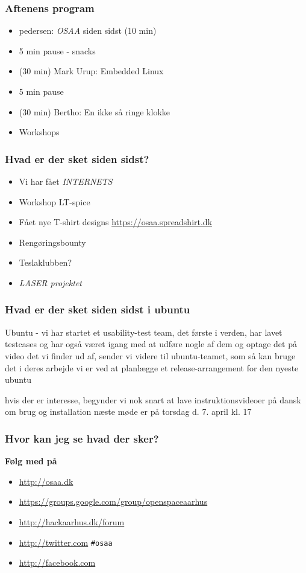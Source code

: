 \documentclass{beamer}
\begin{document}
\begin{frame}
  \frametitle{Aftenens program}
  \begin{itemize}
  \item pedersen: \emph{OSAA} siden sidst (10 min)
  \item 5 min pause - snacks
  \item  (30 min) Mark Urup: Embedded Linux 
  \item 5 min pause
  \item  (30 min) Bertho: En ikke så ringe klokke
  \item Workshops

  \end{itemize}						
\end{frame}

\begin{frame}
  \frametitle{Hvad er der sket siden sidst?}
  \begin{itemize}

  \item Vi har fået \emph{INTERNETS}
  \item Workshop LT-spice
  \item Fået nye T-shirt designs \url{https://osaa.spreadshirt.dk}
  \item Rengøringsbounty
  \item Teslaklubben?   
  \item \emph{LASER projektet}  
  \end{itemize}						
\end{frame}


\begin{frame}
  \frametitle{Hvad er der sket siden sidst i ubuntu} Ubuntu - vi har
  startet et usability-test team, det første i verden, har lavet
  testcases og har også været igang med at udføre nogle af dem og
  optage det på video det vi finder ud af, sender
  vi videre til ubuntu-teamet, som så kan bruge det i deres arbejde
   vi er ved at planlægge et release-arrangement
  for den nyeste ubuntu 
 
hvis der er interesse, begynder vi nok snart at lave
instruktionsvideoer på dansk om brug og installation næste møde er på
torsdag d. 7. april kl. 17
				
\end{frame}



\begin{frame}
  \frametitle{Hvor kan jeg se hvad der sker?}
  \textbf{Følg med på}
  \begin{itemize}
  \item  \url{http://osaa.dk}
  \item  \url{https://groups.google.com/group/openspaceaarhus}
  \item  \url{http://hackaarhus.dk/forum}
  \item  \url{http://twitter.com} \texttt{\#osaa}
  \item  \url{http://facebook.com} 
  \end{itemize}						
\end{frame}
\end{document}
